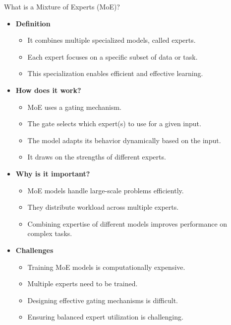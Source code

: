 \begin{frame}[allowframebreaks]{What is a Mixture of Experts (MoE)?}
    \begin{itemize}
        \item \textbf{Definition}
        \begin{itemize}
            \item It combines multiple specialized models, called experts.
            \item Each expert focuses on a specific subset of data or task.
            \item This specialization enables efficient and effective learning.
        \end{itemize}
        \item \textbf{How does it work?}
        \begin{itemize}
            \item MoE uses a gating mechanism.
            \item The gate selects which expert(s) to use for a given input.
            \item The model adapts its behavior dynamically based on the input.
            \item It draws on the strengths of different experts.
        \end{itemize}
    \end{itemize}

    \framebreak

    \begin{itemize}
        \item \textbf{Why is it important?}
        \begin{itemize}
            \item MoE models handle large-scale problems efficiently.
            \item They distribute workload across multiple experts.
            \item Combining expertise of different models improves performance on complex tasks.
        \end{itemize}
        \item \textbf{Challenges}
        \begin{itemize}
            \item Training MoE models is computationally expensive.
            \item Multiple experts need to be trained.
            \item Designing effective gating mechanisms is difficult.
            \item Ensuring balanced expert utilization is challenging.
        \end{itemize}
    \end{itemize}


\end{frame}
